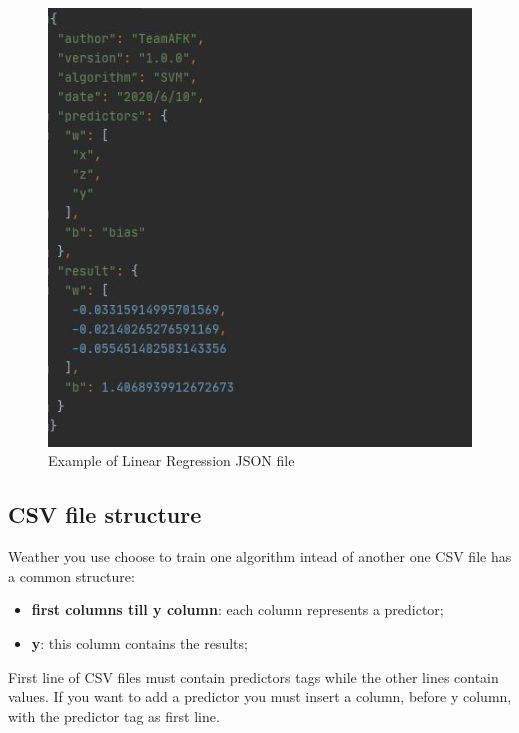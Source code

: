		\begin{figure}[H]
		\centering
		\includegraphics[scale=0.70]{../Developer_manual/img/support_vector_machine_json.JPG}
		\caption{Example of Linear Regression JSON file}
	\end{figure}	
		
	
	\subsection{CSV file structure}
Weather you use choose to train one algorithm intead of another one CSV file has a common structure:
	\begin{itemize}
		\item\textbf{first columns till y column}: each column represents a predictor;
		\item\textbf{y}: this column contains the results; 	
	\end{itemize}	 

First line of CSV files must contain predictors tags while the other lines contain values. If you want to add a predictor you must insert a column, before y column, with the predictor tag as first line.

